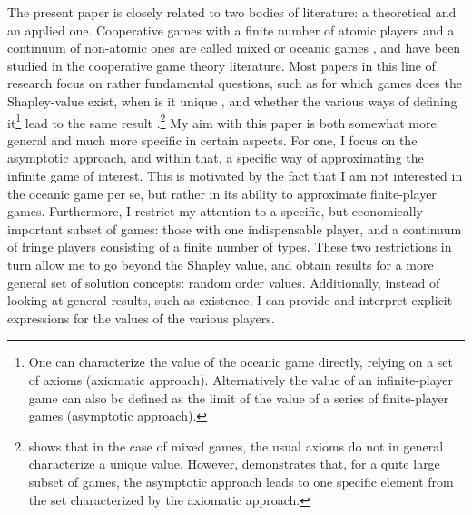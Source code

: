 \documentclass[a4paper]{article}
\begin{document}
The present paper is closely related to two bodies of literature: a theoretical and an applied one.
Cooperative games with a finite number of atomic players and a continuum of non-atomic ones are called mixed or oceanic games \parencite{milnor1978values}, and have been studied in the cooperative game theory literature.
Most papers in this line of research focus on rather fundamental questions, such as for which games does the Shapley-value exist, when is it unique \parencite{hart1973values}, and whether the various ways of defining it\footnote{
    One can characterize the value of the oceanic game directly, relying on a set of axioms (axiomatic approach). Alternatively the value of an infinite-player game can also be defined as the limit of the value of a series of finite-player games (asymptotic approach).
} lead to the same result \parencite{fogelman1980asymptotic}.\footnote{
    \textcite{hart1973values} shows that in the case of mixed games, the usual axioms do not in general characterize a unique value.
    However, \textcite{fogelman1980asymptotic} demonstrates that, for a quite large subset of games, the asymptotic approach leads to one specific element from the set characterized by the axiomatic approach. 
}
My aim with this paper is both somewhat more general and much more specific in certain aspects.
For one, I focus on the asymptotic approach, and within that, a specific way of approximating the infinite game of interest.
This is motivated by the fact that I am not interested in the oceanic game per se, but rather in its ability to approximate finite-player games.
Furthermore, I restrict my attention to a specific, but economically important subset of games: those with one indispensable player, and a continuum of fringe players consisting of a finite number of types.
These two restrictions in turn allow me to go beyond the Shapley value, and obtain results for a more general set of solution concepts: random order values.
Additionally, instead of looking at general results, such as existence, I can provide and interpret explicit expressions for the values of the various players.
\end{document}
